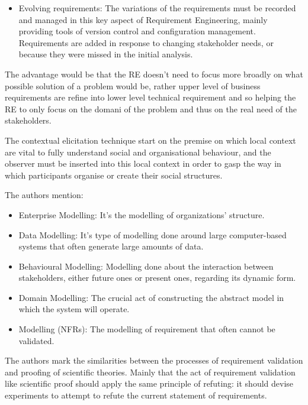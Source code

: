 \begin{elenco}
\begin{itemize}
		\item Evolving requirements: The variations of the requirements must be recorded and managed in this key aspect of Requirement Engineering, mainly providing tools of version control and configuration management. Requirements are added in response to changing stakeholder needs, or because they were missed in the initial analysis.
	\end{itemize}
	\item The advantage would be that the RE doesn't need to focus more broadly on what possible solution of a problem would be, rather upper level of business requirements are refine into lower level technical requirement and so helping the RE to only focus on the domani of the problem and thus on the real need of the stakeholders.
	\item The contextual elicitation technique start on the premise on which local context are vital to fully understand social and organisational behaviour, and the observer must be inserted into this local context in order to gasp the way in which participants organise or create their social structures.
	\item The authors mention:
	\begin{itemize}
		\item Enterprise Modelling: It's the modelling of organizations' structure. 
		\item Data Modelling: It's type of modelling done around large computer-based systems that often generate large amounts of data.
		\item Behavioural Modelling: Modelling done about the interaction between stakeholders, either future ones or present ones, regarding its dynamic form.
		\item Domain Modelling: The crucial act of constructing the abstract model in which the system will operate.
		\item Modelling (NFRs): The modelling of requirement that often cannot be validated.
	\end{itemize}
	\item The authors mark the similarities between the processes of requirement validation and proofing of scientific theories. Mainly that the act of requirement validation like scientific  proof should apply the same principle of refuting: it should devise experiments to attempt to refute the current statement of requirements.
	\end{elenco}
